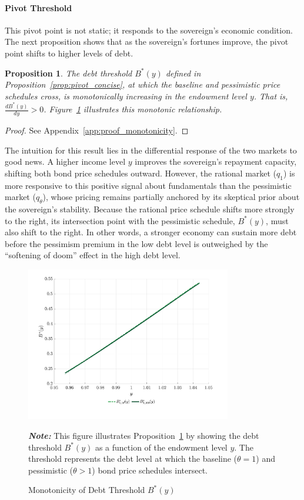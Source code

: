 \documentclass[12pt]{article}
\theoremstyle{plain}
\newtheorem{proposition}{Proposition}
\begin{document}
\paragraph{Pivot Threshold}This pivot point is not static; it responds to the sovereign's economic
condition. The next proposition shows that as the sovereign's fortunes improve,
the pivot point shifts to higher levels of debt.

\begin{proposition}
	\label{prop:monotonicity}
	The debt threshold $B^*(y)$ defined in Proposition~\ref{prop:pivot_concise}, at which the baseline and pessimistic price schedules cross, is monotonically increasing in the endowment level $y$. That is, $\frac{dB^*(y)}{dy} > 0$. Figure~\ref{fig:monotonicity} illustrates this monotonic relationship.
\end{proposition}

\begin{proof}
	See Appendix~\ref{app:proof_monotonicity}.
\end{proof}
The intuition for this result lies in the differential response of the two markets to good news. A higher income level $y$ improves the sovereign's repayment capacity, shifting both bond price schedules outward. However, the rational market ($q_1$) is more responsive to this positive signal about fundamentals than the pessimistic market ($q_\theta$), whose pricing remains partially anchored by its skeptical prior about the sovereign's stability. Because the rational price schedule shifts more strongly to the right, its intersection point with the pessimistic schedule, $B^*(y)$, must also shift to the right. In other words, a stronger economy can sustain more debt before the pessimism premium in the low debt level is outweighed by the ``softening of doom'' effect in the high debt level.

\begin{figure}[htb]
	\centering
	\includegraphics[width=0.8\textwidth]{../../pessimism-default-model/results/comparison_figure_10.pdf}
	\caption{Monotonicity of Debt Threshold $B^*(y)$}
	\label{fig:monotonicity}
	\parbox{\textwidth}{\small\textit{\textbf{Note:} }This figure illustrates Proposition~\ref{prop:monotonicity} by showing the debt threshold $B^*(y)$ as a function of the endowment level $y$. The threshold represents the debt level at which the baseline ($\theta=1$) and pessimistic ($\theta>1$) bond price schedules intersect.}
\end{figure}
\end{document}
